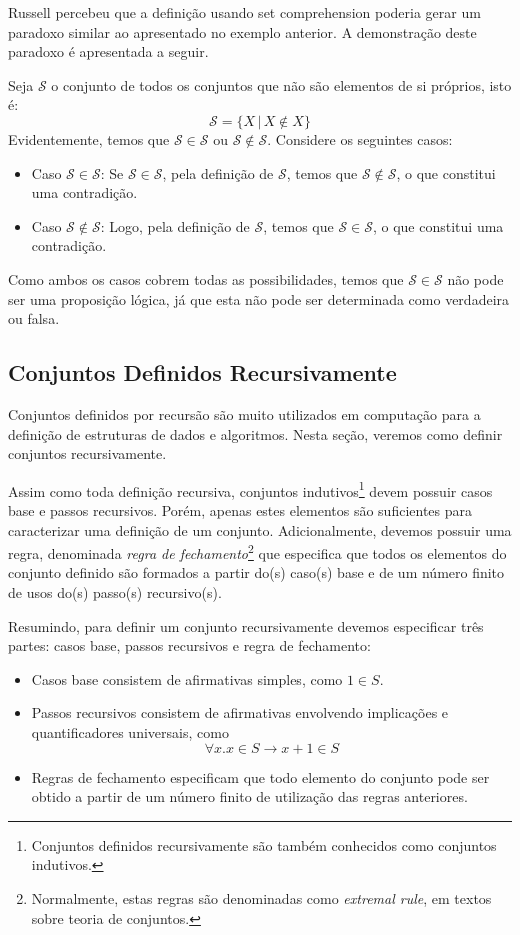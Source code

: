 Russell percebeu que a definição usando set comprehension poderia
gerar um paradoxo similar ao apresentado no exemplo
anterior. A demonstração deste paradoxo é apresentada a seguir.

Seja $\mathcal{S}$ o conjunto de todos os conjuntos que não
são elementos de si próprios, isto é:
\[\mathcal{S} =\{X\,|\,X\not\in X\}\]
Evidentemente, temos que $\mathcal{S} \in \mathcal{S}$ ou $\mathcal{S}
\not\in \mathcal{S}$. Considere os seguintes casos:
\begin{itemize}
  \item Caso $\mathcal{S} \in \mathcal{S}$: Se $\mathcal{S} \in
    \mathcal{S}$, pela definição de $\mathcal{S}$, temos que
    $\mathcal{S} \not\in \mathcal{S}$, o que constitui uma contradição.
  \item Caso $\mathcal{S} \not\in \mathcal{S}$: Logo, pela definição
    de $\mathcal{S}$, temos que $\mathcal{S} \in \mathcal{S}$, o que
    constitui uma contradição.
\end{itemize}
Como ambos os casos cobrem todas as possibilidades, temos que
$\mathcal{S}\in\mathcal{S}$ não pode ser uma proposição lógica, já que
esta não pode ser determinada como verdadeira ou falsa.

\subsection{Conjuntos Definidos Recursivamente}

Conjuntos definidos por recursão são muito utilizados em computação
para a definição de estruturas de dados e algoritmos. Nesta seção,
veremos como definir conjuntos recursivamente.

Assim como toda definição recursiva, conjuntos
indutivos\footnote{Conjuntos definidos recursivamente são também conhecidos
  como conjuntos indutivos.} devem possuir casos base e passos
recursivos. Porém, apenas estes elementos são suficientes para
caracterizar uma definição de um conjunto. Adicionalmente, devemos
possuir uma regra, denominada \emph{regra de
  fechamento}\footnote{Normalmente, estas regras são denominadas como
  \emph{extremal rule}, em textos sobre teoria de conjuntos.} que
especifica que todos os elementos do conjunto definido são formados a
partir do(s) caso(s) base e de um número finito de usos do(s)
passo(s) recursivo(s).

Resumindo, para definir um conjunto recursivamente devemos especificar
três partes: casos base, passos recursivos e regra de fechamento:
\begin{itemize}
  \item Casos base consistem de afirmativas simples, como $1\in S$.
   \item Passos recursivos consistem de afirmativas envolvendo
     implicações e quantificadores universais, como \[\forall x. x\in
     S \to x + 1 \in S\]
   \item Regras de fechamento especificam que todo elemento do
     conjunto pode ser obtido a partir de um número finito de
     utilização das regras anteriores.
\end{itemize}


